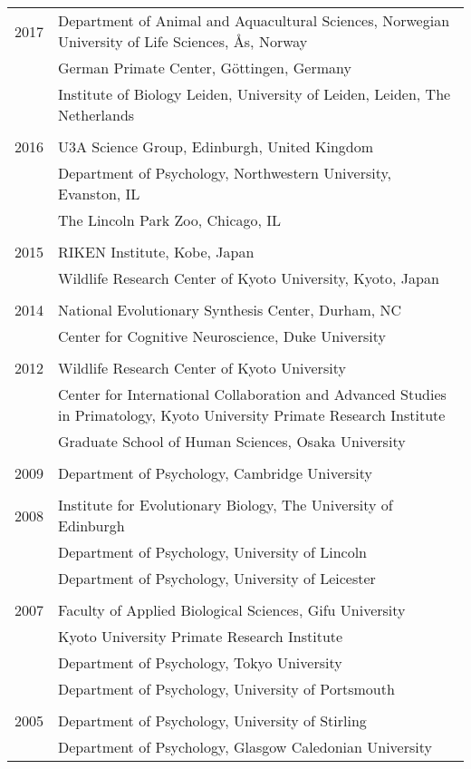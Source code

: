 \documentclass[11pt]{article}
\begin{document}
\begin{tabular}{p{3cm}p{12cm}}
2017 & Department of Animal and Aquacultural Sciences, Norwegian University of Life Sciences, {\AA}s, Norway \\
& German Primate Center, G\"{o}ttingen, Germany \\
& Institute of Biology Leiden, University of Leiden, Leiden, The
Netherlands \\ \\
2016 & U3A Science Group, Edinburgh, United Kingdom \\
& Department of Psychology, Northwestern University, Evanston, IL \\
& The Lincoln Park Zoo, Chicago, IL \\ \\
2015 & RIKEN Institute, Kobe, Japan \\ 
& Wildlife Research Center of Kyoto University, Kyoto, Japan \\ \\
2014 & National Evolutionary Synthesis Center, Durham, NC \\
& Center for Cognitive Neuroscience, Duke University \\ \\
2012 & Wildlife Research Center of Kyoto University \\
& Center for International Collaboration and Advanced Studies in
Primatology, Kyoto University Primate Research Institute \\
& Graduate School of Human Sciences, Osaka University \\ \\
2009 & Department of Psychology, Cambridge University \\ \\
2008 & Institute for Evolutionary Biology, The University of Edinburgh
\\
& Department of Psychology, University of Lincoln \\
& Department of Psychology, University of Leicester \\ \\
2007 & Faculty of Applied Biological Sciences, Gifu University \\
& Kyoto University Primate Research Institute \\
& Department of Psychology, Tokyo University \\
& Department of Psychology, University of Portsmouth \\ \\
2005 & Department of Psychology, University of Stirling \\
& Department of Psychology, Glasgow Caledonian University
\end{tabular}
\end{document}
